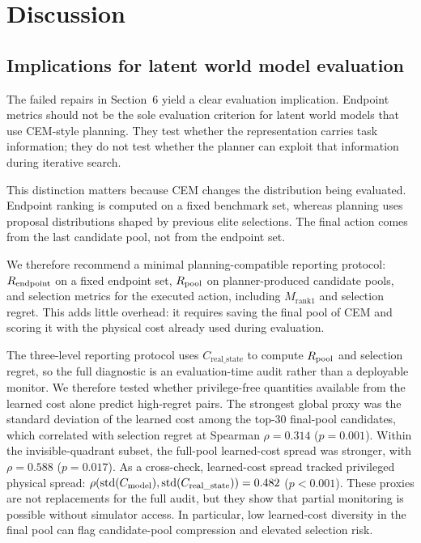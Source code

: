 \section{Discussion}

\subsection{Implications for latent world model evaluation}

The failed repairs in Section~6 yield a clear evaluation implication. Endpoint metrics should not be the sole evaluation criterion for latent world models that use CEM-style planning. They test whether the representation carries task information; they do not test whether the planner can exploit that information during iterative search.

This distinction matters because CEM changes the distribution being evaluated. Endpoint ranking is computed on a fixed benchmark set, whereas planning uses proposal distributions shaped by previous elite selections. The final action comes from the last candidate pool, not from the endpoint set.

We therefore recommend a minimal planning-compatible reporting protocol: $R_\text{endpoint}$ on a fixed endpoint set, $R_\text{pool}$ on planner-produced candidate pools, and selection metrics for the executed action, including $M_\mathrm{rank1}$ and selection regret. This adds little overhead: it requires saving the final pool of CEM and scoring it with the physical cost already used during evaluation.

The three-level reporting protocol uses $C_\mathrm{real\_state}$ to compute $R_\text{pool}$ and selection regret, so the full diagnostic is an evaluation-time audit rather than a deployable monitor. We therefore tested whether privilege-free quantities available from the learned cost alone predict high-regret pairs. The strongest global proxy was the standard deviation of the learned cost among the top-30 final-pool candidates, which correlated with selection regret at Spearman $\rho=0.314$ ($p=0.001$). Within the invisible-quadrant subset, the full-pool learned-cost spread was stronger, with $\rho=0.588$ ($p=0.017$). As a cross-check, learned-cost spread tracked privileged physical spread: $\rho(\mathrm{std}(C_\text{model}), \mathrm{std}(C_\mathrm{real\_state}))=0.482$ ($p<0.001$). These proxies are not replacements for the full audit, but they show that partial monitoring is possible without simulator access. In particular, low learned-cost diversity in the final pool can flag candidate-pool compression and elevated selection risk.

